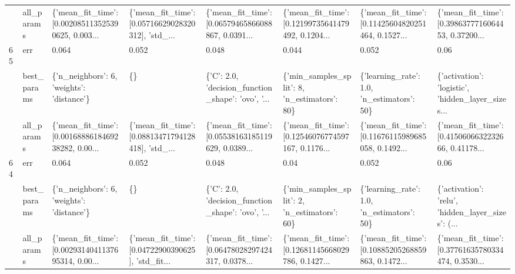 \begin{tabular}{llllllll}
   & all\_params &  \{'mean\_fit\_time': [0.002085113525390625, 0.003... &  \{'mean\_fit\_time': [0.05716629028320312], 'std\_... &  \{'mean\_fit\_time': [0.06579465866088867, 0.0391... &  \{'mean\_fit\_time': [0.12199735641479492, 0.1204... &  \{'mean\_fit\_time': [0.11425604820251464, 0.1527... &  \{'mean\_fit\_time': [0.3986377716064453, 0.37200... \\
65 & err &                                              0.064 &                                              0.052 &                                              0.048 &                                              0.044 &                                              0.052 &                                               0.06 \\
   & best\_params &          \{'n\_neighbors': 6, 'weights': 'distance'\} &                                                 \{\} &  \{'C': 2.0, 'decision\_function\_shape': 'ovo', '... &       \{'min\_samples\_split': 8, 'n\_estimators': 80\} &         \{'learning\_rate': 1.0, 'n\_estimators': 50\} &  \{'activation': 'logistic', 'hidden\_layer\_sizes... \\
   & all\_params &  \{'mean\_fit\_time': [0.0016888618469238282, 0.00... &  \{'mean\_fit\_time': [0.08813471794128418], 'std\_... &  \{'mean\_fit\_time': [0.05538163185119629, 0.0389... &  \{'mean\_fit\_time': [0.12546076774597167, 0.1176... &  \{'mean\_fit\_time': [0.11676115989685058, 0.1492... &  \{'mean\_fit\_time': [0.4150606632232666, 0.41178... \\
64 & err &                                              0.064 &                                              0.052 &                                              0.048 &                                               0.04 &                                              0.052 &                                               0.06 \\
   & best\_params &          \{'n\_neighbors': 6, 'weights': 'distance'\} &                                                 \{\} &  \{'C': 2.0, 'decision\_function\_shape': 'ovo', '... &       \{'min\_samples\_split': 2, 'n\_estimators': 60\} &         \{'learning\_rate': 1.0, 'n\_estimators': 50\} &  \{'activation': 'relu', 'hidden\_layer\_sizes': (... \\
   & all\_params &  \{'mean\_fit\_time': [0.0029314041137695314, 0.00... &  \{'mean\_fit\_time': [0.04722900390625], 'std\_fit... &  \{'mean\_fit\_time': [0.06478028297424317, 0.0378... &  \{'mean\_fit\_time': [0.12681145668029786, 0.1427... &  \{'mean\_fit\_time': [0.10885205268859863, 0.1472... &  \{'mean\_fit\_time': [0.37761635780334474, 0.3530... \\

\end{tabular}
